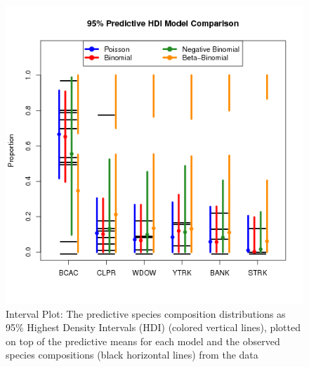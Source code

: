 \documentclass[12pt]{article}
\begin{document}
\begin{figure}[h!]
\centering
\includegraphics{./pictures/compPlot1982Qtr2.png}
\caption{Interval Plot: The predictive species composition distributions
as 95\% Highest Density Intervals (HDI) (colored vertical lines),
plotted on top of the predictive means for each model and the observed
species compositions (black horizontal lines) from the data}
\label{interval}
\end{figure}

%
\clearpage
%
\end{document}
